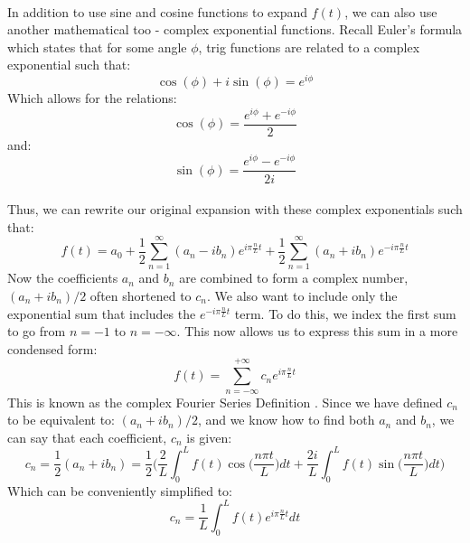 \documentclass[12pt,letterpaper]{article}
\begin{document}
\paragraph*{}In addition to use sine and cosine functions to expand $f(t)$, we can also use another mathematical too - complex exponential functions. Recall Euler's formula which states that for some angle $\phi$, trig functions are related to a complex exponential such that:
\begin{equation}
\label{euler}
\cos(\phi) + i\sin(\phi) = e^{i\phi}
\end{equation}
Which allows for the relations:
\begin{equation}
\cos(\phi) = \frac{e^{i\phi}+e^{-i\phi}}{2}
\end{equation}
and:
\begin{equation}
\sin(\phi) = \frac{e^{i\phi}-e^{-i\phi}}{2i}
\end{equation}
\paragraph*{}Thus, we can rewrite our original expansion with these complex exponentials such that:
\begin{equation}
f(t) = a_0 + \frac{1}{2} \sum_{n=1}^{\infty} (a_n - ib_n)e^{i\pi\frac{n}{L}t} +
\frac{1}{2} \sum_{n=1}^{\infty} (a_n + ib_n)e^{-i\pi\frac{n}{L}t}
\end{equation}
Now the coefficients $a_n$ and $b_n$ are combined to form a complex number, 
$(a_n + ib_n)/2$ often shortened to $c_n$. We also want to include only the exponential sum that includes the $e^{-i\pi\frac{n}{L}t}$ term. To do this, we index the first sum to go from $n = -1$ to $n = -\infty$.
This now allows us to express this sum in a more condensed form:
\begin{equation}
\label{complex series def}
f(t) = \sum_{n=-\infty}^{+\infty} c_n e^{i\pi\frac{n}{L}t}
\end{equation}
This is known as the complex Fourier Series Definition \cite{Haberman}. Since we have defined $c_n$ to be equivalent to: $(a_n + ib_n)/2$, and we know how to find both $a_n$ and $b_n$, we can say that each coefficient, $c_n$ is given:
\begin{equation}
c_n = \frac{1}{2}(a_n + ib_n) = \frac{1}{2}\Bigg(
\frac{2}{L}\int_0^L f(t)\cos\Big(\frac{n\pi t}{L}\Big) dt +
\frac{2i}{L}\int_0^L f(t)\sin\Big(\frac{n\pi t}{L}\Big) dt \Bigg)
\end{equation}
Which can be conveniently simplified to:
\begin{equation}
\label{c_n}
c_n = \frac{1}{L}\int_0^L f(t) e^{i\pi\frac{n}{L}t} dt
\end{equation}
\end{document}
